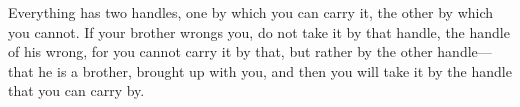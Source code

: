 Everything has two handles,  one by which you can carry it,  the other by which
you cannot.  If your brother  wrongs you,  do not take  it by that  handle, the
handle of his wrong,  for you cannot carry it by that, but  rather by the other
handle---that he is a  brother, brought up with you, and then  you will take it
by the handle that you can carry by.
